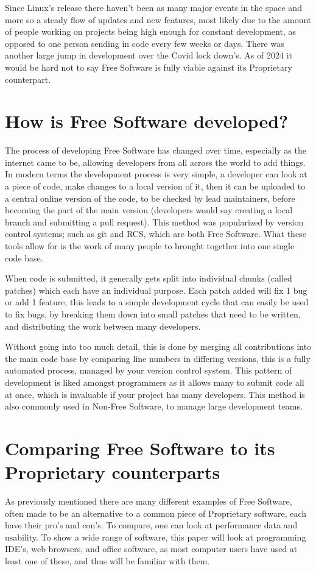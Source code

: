 \documentclass[a4paper,12pt]{article}
\begin{document}
{Since Linux's release there haven't been as many major events in the space and more so a steady flow of updates
and new features, most likely due to the amount of people working on projects being high enough for constant
development, as opposed to one person sending in code every few weeks or days.	There was another large jump
in development over the Covid lock down's. As of 2024 it would be hard not to say Free Software is fully viable
against its Proprietary counterpart.

\section{How is Free Software developed?} 
The process of developing Free Software has changed over time, especially
as the internet came to be, allowing developers from all across the world to add things. In modern terms the
development process is very simple, a developer can look at a piece of code, make changes to a local version of
it, then it can be uploaded to a central online version of the code, to be checked by lead maintainers, before
becoming the part of the main version (developers would say creating a local branch and submitting a pull request).
This method was popularized by version control systems; such as git\cite{GIT} and RCS, which are both Free Software.
What these tools allow for is the work of many people to brought together into one single code base.

When code is submitted, it generally gets split into individual chunks (called patches) which each have an individual
purpose. Each patch added will fix 1 bug or add 1 feature, this leads to a simple development cycle that can easily
be used to fix bugs, by breaking them down into small patches that need to be written, and distributing the work
between many developers.

Without going into too much detail, this is done by merging all contributions into the main code base by
comparing line numbers in differing versions, this is a fully automated process, managed by your version control
system. This pattern of development is liked amongst programmers as it allows many to submit code all at once,
which is invaluable if your project has many developers. This method is also commonly used in Non-Free Software,
to manage large development teams\cite{NONFREEvcs}.

\section{Comparing Free Software to its Proprietary counterparts} 
As previously mentioned there are many different
examples of Free Software, often made to be an alternative to a common piece of Proprietary software, each have
their pro's and con's. To compare, one can look at performance data and usability. To show a wide range of software,
this paper will look at programming IDE's, web browsers, and office software, as most computer users have used at
least one of these, and thus will be familiar with them.

}
\end{document}
